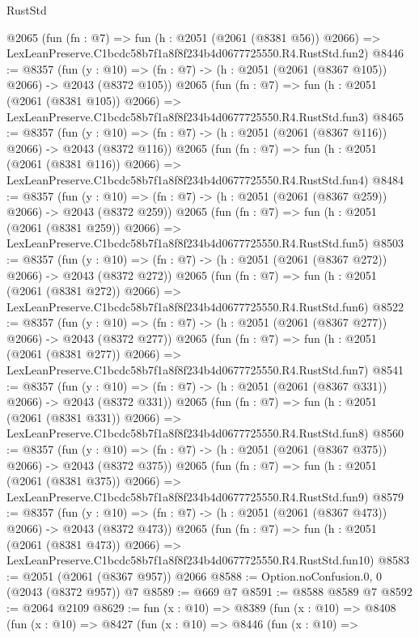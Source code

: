 \begin{lexlean}{RustStd}
\begin{coremodule}
    @2065
    (fun (fn : @7) =>
    fun (h : @2051 (@2061 (@8381 @56)) @2066) =>
    LexLeanPreserve.C1bcdc58b7f1a8f8f234b4d0677725550.R4.RustStd.fun2)
@8446 := @8357
    (fun (y : @10) => (fn : @7) -> (h : @2051 (@2061 (@8367 @105)) @2066) -> @2043 (@8372 @105))
    @2065
    (fun (fn : @7) =>
    fun (h : @2051 (@2061 (@8381 @105)) @2066) =>
    LexLeanPreserve.C1bcdc58b7f1a8f8f234b4d0677725550.R4.RustStd.fun3)
@8465 := @8357
    (fun (y : @10) => (fn : @7) -> (h : @2051 (@2061 (@8367 @116)) @2066) -> @2043 (@8372 @116))
    @2065
    (fun (fn : @7) =>
    fun (h : @2051 (@2061 (@8381 @116)) @2066) =>
    LexLeanPreserve.C1bcdc58b7f1a8f8f234b4d0677725550.R4.RustStd.fun4)
@8484 := @8357
    (fun (y : @10) => (fn : @7) -> (h : @2051 (@2061 (@8367 @259)) @2066) -> @2043 (@8372 @259))
    @2065
    (fun (fn : @7) =>
    fun (h : @2051 (@2061 (@8381 @259)) @2066) =>
    LexLeanPreserve.C1bcdc58b7f1a8f8f234b4d0677725550.R4.RustStd.fun5)
@8503 := @8357
    (fun (y : @10) => (fn : @7) -> (h : @2051 (@2061 (@8367 @272)) @2066) -> @2043 (@8372 @272))
    @2065
    (fun (fn : @7) =>
    fun (h : @2051 (@2061 (@8381 @272)) @2066) =>
    LexLeanPreserve.C1bcdc58b7f1a8f8f234b4d0677725550.R4.RustStd.fun6)
@8522 := @8357
    (fun (y : @10) => (fn : @7) -> (h : @2051 (@2061 (@8367 @277)) @2066) -> @2043 (@8372 @277))
    @2065
    (fun (fn : @7) =>
    fun (h : @2051 (@2061 (@8381 @277)) @2066) =>
    LexLeanPreserve.C1bcdc58b7f1a8f8f234b4d0677725550.R4.RustStd.fun7)
@8541 := @8357
    (fun (y : @10) => (fn : @7) -> (h : @2051 (@2061 (@8367 @331)) @2066) -> @2043 (@8372 @331))
    @2065
    (fun (fn : @7) =>
    fun (h : @2051 (@2061 (@8381 @331)) @2066) =>
    LexLeanPreserve.C1bcdc58b7f1a8f8f234b4d0677725550.R4.RustStd.fun8)
@8560 := @8357
    (fun (y : @10) => (fn : @7) -> (h : @2051 (@2061 (@8367 @375)) @2066) -> @2043 (@8372 @375))
    @2065
    (fun (fn : @7) =>
    fun (h : @2051 (@2061 (@8381 @375)) @2066) =>
    LexLeanPreserve.C1bcdc58b7f1a8f8f234b4d0677725550.R4.RustStd.fun9)
@8579 := @8357
    (fun (y : @10) => (fn : @7) -> (h : @2051 (@2061 (@8367 @473)) @2066) -> @2043 (@8372 @473))
    @2065
    (fun (fn : @7) =>
    fun (h : @2051 (@2061 (@8381 @473)) @2066) =>
    LexLeanPreserve.C1bcdc58b7f1a8f8f234b4d0677725550.R4.RustStd.fun10)
@8583 := @2051 (@2061 (@8367 @957)) @2066
@8588 := Option.noConfusion.{0, 0} (@2043 (@8372 @957)) @7
@8589 := @669 @7
@8591 := @8588 @8589 @7
@8592 := @2064 @2109
@8629 := fun (x : @10) =>
  @8389
    (fun (x : @10) =>
    @8408
      (fun (x : @10) =>
      @8427
        (fun (x : @10) =>
        @8446
          (fun (x : @10) =>

\end{coremodule}
\end{lexlean}

